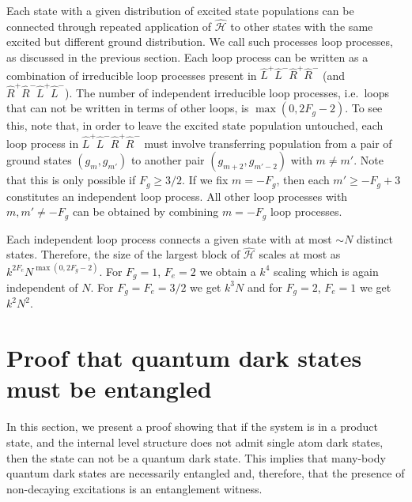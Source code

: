 \documentclass[aps,prx,superscriptaddress,twocolumn,notitlepage,nofootinbib,longbibliography]{revtex4-2}
\begin{document}
Each state with a given distribution of excited state populations can be connected through repeated application of $\hat{\mathcal{H}}$ to other states with the same excited but different ground distribution. We call such processes loop processes, as discussed in the previous section. Each loop process can be written as a combination of irreducible loop processes present in $\hat{L}^+\hat{L}^-\hat{R}^+\hat{R}^-$ (and $\hat{R}^+\hat{R}^-\hat{L}^+\hat{L}^-$). The number of independent irreducible loop processes, i.e.~loops that can not be written in terms of other loops, is $\max(0,2F_g-2)$.
To see this, note that, in order to leave the excited state population untouched, each loop process in $\hat{L}^+\hat{L}^-\hat{R}^+\hat{R}^-$ must involve transferring population from a pair of ground states $(g_m,g_{m'})$ to another pair $(g_{m+2},g_{m'-2})$ with $m\neq m'$. Note that this is only possible if $F_g\geq3/2$. If we fix $m=-F_g$, then each $m'\geq -F_g+3$ constitutes an independent loop process. All other loop processes with $m,m'\neq-F_g$ can be obtained by combining $m=-F_g$ loop processes.

Each independent loop process connects a given state with at most $\sim N$ distinct states. Therefore, the size of the largest block of $\hat{\mathcal{H}}$ scales at most as $k^{2F_e}N^{\max(0,2F_g-2)}$. For $F_g=1$, $F_e=2$ we obtain a $k^4$ scaling which is again independent of $N$. For $F_g=F_e=3/2$ we get $k^3N$ and for $F_g=2$, $F_e=1$ we get $k^2N^2$.








\section{Proof that quantum dark states must be entangled\label{app:product_dark}}

In this section, we present a proof showing that if the system is in a product state, and the internal level structure does not admit single atom dark states, then the state can not be a quantum dark state. This implies that many-body quantum dark states are necessarily entangled and, therefore, that the presence of non-decaying excitations is an entanglement witness.
\end{document}
